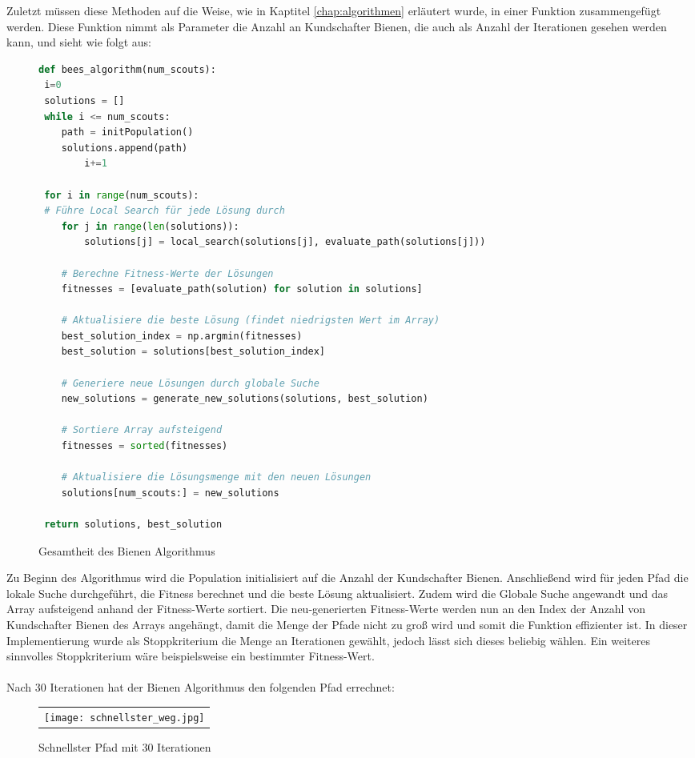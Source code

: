 Zuletzt müssen diese Methoden auf die Weise, wie in Kaptitel \ref{chap:algorithmen} erläutert wurde, in einer Funktion zusammengefügt werden. Diese Funktion nimmt als Parameter die Anzahl an Kundschafter Bienen, die auch als Anzahl der Iterationen gesehen werden kann, und sieht wie folgt aus:
\begin{figure}[H]
    \begin{lstlisting}[language=python]
def bees_algorithm(num_scouts):
 i=0
 solutions = []
 while i <= num_scouts:    
    path = initPopulation()
    solutions.append(path)
        i+=1

 for i in range(num_scouts):
 # Führe Local Search für jede Lösung durch
    for j in range(len(solutions)):
        solutions[j] = local_search(solutions[j], evaluate_path(solutions[j]))

    # Berechne Fitness-Werte der Lösungen
    fitnesses = [evaluate_path(solution) for solution in solutions]

    # Aktualisiere die beste Lösung (findet niedrigsten Wert im Array)
    best_solution_index = np.argmin(fitnesses)
    best_solution = solutions[best_solution_index]

    # Generiere neue Lösungen durch globale Suche
    new_solutions = generate_new_solutions(solutions, best_solution)

    # Sortiere Array aufsteigend
    fitnesses = sorted(fitnesses)

    # Aktualisiere die Lösungsmenge mit den neuen Lösungen
    solutions[num_scouts:] = new_solutions

 return solutions, best_solution
\end{lstlisting}
\caption{Gesamtheit des Bienen Algorithmus}
\end{figure}
Zu Beginn des Algorithmus wird die Population initialisiert auf die Anzahl der Kundschafter Bienen. Anschließend wird für jeden Pfad die lokale Suche durchgeführt, die Fitness berechnet und die beste Lösung aktualisiert. Zudem wird die Globale Suche angewandt und das Array aufsteigend anhand der Fitness-Werte sortiert. Die neu-generierten Fitness-Werte werden nun an den Index der Anzahl von Kundschafter Bienen des Arrays angehängt, damit die Menge der Pfade nicht zu groß wird und somit die Funktion effizienter ist.  
In dieser Implementierung wurde als Stoppkriterium die Menge an Iterationen gewählt, jedoch lässt sich dieses beliebig wählen. Ein weiteres sinnvolles Stoppkriterium wäre beispielsweise ein bestimmter Fitness-Wert. \\\\
Nach 30 Iterationen hat der Bienen Algorithmus den folgenden Pfad errechnet:
\begin{figure}[H]
    \begin{tabular}{@{}r@{}} 
        \texttt{[image: schnellster\_weg.jpg]}
    \end{tabular}
    \caption{Schnellster Pfad mit 30 Iterationen\\}   
    \label{fig:schnellster}
\end{figure}

